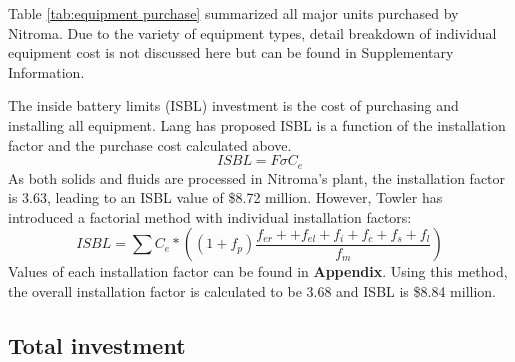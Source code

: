 Table \ref{tab:equipment purchase} summarized all major units purchased by Nitroma. Due to the variety of equipment types, detail breakdown of individual equipment cost is not discussed here but can be found in Supplementary Information.

The inside battery limits (ISBL) investment is the cost of purchasing and installing all equipment. Lang has proposed ISBL is a function of the installation factor and the purchase cost calculated above.
\begin{equation}
    ISBL=F\sigma C_{e}    
\end{equation}
As both solids and fluids are processed in Nitroma's plant, the installation factor is 3.63, leading to an ISBL value of \$8.72 million. However, Towler\cite{sinnott_chemical_2020} has introduced a factorial method with individual installation factors:
\begin{equation}
    ISBL=\sum C_{e}*\left(\left(1+f_{p}\right)\frac{f_{er}++f_{el}+f_{i}+f_{c}+f_{s}+f_{l}}{f_{m}}\right)
\end{equation}
Values of each installation factor can be found in \textbf{Appendix}. Using this method, the overall installation factor is calculated to be 3.68 and ISBL is \$8.84 million.

\subsection{Total investment}


